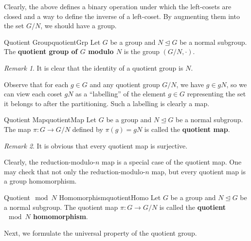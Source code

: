 \documentclass[math]{amznotes}
\theoremstyle{remark}
\newtheorem*{remark}{Remark}
\newcommand{\0}{\mathbf{0}}
\newcommand{\1}{\mathbf{1}}
\begin{document}
Clearly, the above defines a binary operation under which the left-cosets are closed and a way to define the inverse of a left-coset. By augmenting them into the set $G \slash N$, we should have a group.
\begin{dfnbox}{Quotient Group}{quotientGrp}
    Let $G$ be a group and $N \trianglelefteq G$ be a normal subgroup. The {\color{red} \textbf{quotient group of $G$ modulo $N$}} is the group $\left(G \slash N, \cdot\right)$.
\end{dfnbox}
\begin{notebox}
    \begin{remark}
        It is clear that the identity of a quotient group is $N$.
    \end{remark}
\end{notebox}
Observe that for each $g \in G$ and any quotient group $G \slash N$, we have $g \in gN$, so we can view each coset $gN$ as a ``labelling'' of the element $g \in G$ representing the set it belongs to after the partitioning. Such a labelling is clearly a map.
\begin{dfnbox}{Quotient Map}{quotientMap}
    Let $G$ be a group and $N \trianglelefteq G$ be a normal subgroup. The map $\pi \colon G \to G \slash N$ defined by $\pi\left(g\right) = gN$ is called the {\color{red} \textbf{quotient map}}.
\end{dfnbox}
\begin{notebox}
    \begin{remark}
        It is obvious that every quotient map is surjective.
    \end{remark}
\end{notebox}
Clearly, the reduction-modulo-$n$ map is a special case of the quotient map. One may check that not only the reduction-modulo-$n$ map, but every quotient map is a group homomorphism.
\begin{dfnbox}{Quotient$\mod N$ Homomorphism}{quotientHomo}
    Let $G$ be a group and $N \trianglelefteq G$ be a normal subgroup. The quotient map $\pi \colon G \to G \slash N$ is called the {\color{red} \textbf{quotient$\mod N$ homomorphism}}.
\end{dfnbox}
Next, we formulate the universal property of the quotient group.
\end{document}
